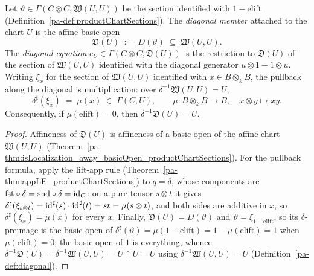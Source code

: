 \begin{definition}
  \label{pa-def:diagonalChart}
  \leanok

  Let \(\vartheta \in \Gamma(C \otimes C, \mathfrak W(U,U))\) be the section identified with
  \(1 - \mathrm{elift}\) (Definition~\ref{pa-def:productChartSections}). The \emph{diagonal member}
  attached to the chart \(U\) is the affine basic open
  \[
    \mathfrak D(U) \;:=\; D(\vartheta) \;\subseteq\; \mathfrak W(U,U).
  \]
  The \emph{diagonal equation} \(e_U \in \Gamma(C \otimes C, \mathfrak D(U))\) is the restriction
  to \(\mathfrak D(U)\) of the section of \(\mathfrak W(U,U)\) identified with the diagonal
  generator \(u \otimes 1 - 1 \otimes u\). Writing \(\xi_x\) for the section of
  \(\mathfrak W(U,U)\) identified with \(x \in B \otimes_k B\), the pullback along the diagonal is
  multiplication: over \(\delta^{-1}\mathfrak W(U,U) = U\),
  \[
    \delta^\sharp(\xi_x) \;=\; \mu(x) \;\in\; \Gamma(C, U), \qquad
    \mu \colon B \otimes_k B \to B, \quad x \otimes y \mapsto xy .
  \]
  Consequently, if \(\mu(\mathrm{elift}) = 0\), then \(\delta^{-1}\mathfrak D(U) = U\).
\end{definition}
\begin{proof}
  \leanok
  Affineness of \(\mathfrak D(U)\) is affineness of a basic open of the affine chart
  \(\mathfrak W(U,U)\) (Theorem~\ref{pa-thm:isLocalization_away_basicOpen_productChartSections}). For
  the pullback formula, apply the lift-app rule (Theorem~\ref{pa-thm:appLE_productChartSections}) to
  \(q = \delta\), whose components are \(\mathrm{fst} \circ \delta = \mathrm{snd} \circ \delta = \operatorname{id}_C\):
  on a pure tensor \(s \otimes t\) it gives
  \(\delta^\sharp(\xi_{s \otimes t}) = \operatorname{id}^\sharp(s) \cdot \operatorname{id}^\sharp(t) = st = \mu(s \otimes t)\),
  and both sides are additive in \(x\), so \(\delta^\sharp(\xi_x) = \mu(x)\) for every \(x\).
  Finally, \(\mathfrak D(U) = D(\vartheta)\) and \(\vartheta = \xi_{1 - \mathrm{elift}}\), so its
  \(\delta\)-preimage is the basic open of
  \(\delta^\sharp(\vartheta) = \mu(1 - \mathrm{elift}) = 1 - \mu(\mathrm{elift}) = 1\) when
  \(\mu(\mathrm{elift}) = 0\); the basic open of \(1\) is everything, whence
  \(\delta^{-1}\mathfrak D(U) = \delta^{-1}\mathfrak W(U,U) = U \cap U = U\) using
  \(\delta^{-1}\mathfrak W(U,U) = U\) (Definition~\ref{pa-def:diagonal}).
\end{proof}

